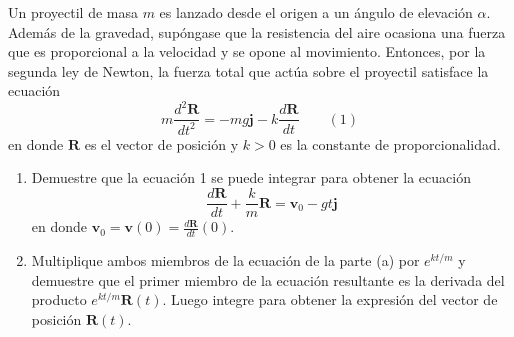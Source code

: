 \item Un proyectil de masa $m$ es lanzado desde el origen a un ángulo de elevación $\alpha$. Además de la gravedad, supóngase que la resistencia del aire ocasiona una fuerza que es proporcional a la velocidad y se opone al movimiento. Entonces, por la segunda ley de Newton, la fuerza total que actúa sobre el proyectil satisface la ecuación
    \[
    m \frac{d^2 \mathbf{R}}{dt^2} = -mg \mathbf{j} - k \frac{d\mathbf{R}}{dt} \qquad (1)
    \]
    en donde $\mathbf{R}$ es el vector de posición y $k > 0$ es la constante de proporcionalidad.
    \begin{enumerate}
        \item Demuestre que la ecuación 1 se puede integrar para obtener la ecuación
        \[
        \frac{d\mathbf{R}}{dt} + \frac{k}{m} \mathbf{R} = \mathbf{v}_0 - g t \mathbf{j}
        \]
        en donde $\mathbf{v}_0 = \mathbf{v}(0) = \frac{d\mathbf{R}}{dt}(0)$.
        \item Multiplique ambos miembros de la ecuación de la parte (a) por $e^{kt/m}$ y demuestre que el primer miembro de la ecuación resultante es la derivada del producto $e^{kt/m} \mathbf{R}(t)$. Luego integre para obtener la expresión del vector de posición $\mathbf{R}(t)$.
    \end{enumerate}
